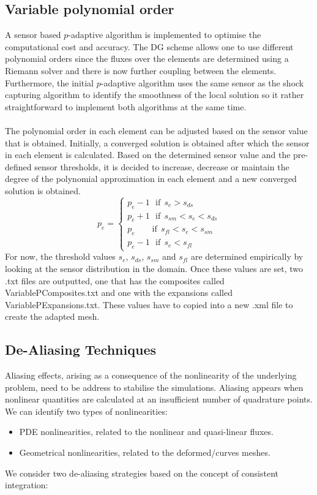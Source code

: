 \subsection{Variable polynomial order}
A sensor based $p$-adaptive algorithm is implemented to optimise the computational cost and accuracy.
The DG scheme allows one to use different polynomial orders since the fluxes over the elements are determined using a Riemann solver and there is now further coupling between the elements. Furthermore, the initial $p$-adaptive algorithm uses the same sensor as the shock capturing algorithm to identify the smoothness of the local solution so it rather straightforward to implement both algorithms at the same time.\\
\\
The polynomial order in each element can be adjusted based on the sensor value that is obtained. Initially, a converged solution is obtained after which the sensor in each element is calculated. Based on the determined sensor value and the pre-defined sensor thresholds, it is decided to increase, decrease or maintain the degree of the polynomial approximation in each element and a new converged solution is obtained.\\
\begin{equation}\label{eq:pswitch}
  p_e =\left \{ \begin{array}{l}
    p_e-1\	\	\ \mbox{if}\		\	 s_e>s_{ds}\\
    p_e+1\	\	\ \mbox{if}\		\	 s_{sm }<s_e<s_{ds}\\
    p_e\	\	\	\	\	\	\	\	\	 \mbox{if}\		\ s_{fl}<s_e<s_{sm}\\
    p_e-1\	\	\ \mbox{if}\		\	 s_e<s_{fl}
    \end{array}
    \right.
\end{equation}
For now, the threshold values $s_e$, $s_{ds}$, $s_{sm}$ and $s_{fl}$ are determined empirically by looking at the sensor distribution in the domain. Once these values are set, two .txt files are outputted, one that has the composites called VariablePComposites.txt and one with the expansions called VariablePExpansions.txt. These values have to copied into a new .xml file to create the adapted mesh.
\subsection{De-Aliasing Techniques}
Aliasing effects, arising as a consequence of the nonlinearity of the
underlying problem, need to be address to stabilise the simulations. Aliasing
appears when nonlinear quantities are calculated at an insufficient number of
quadrature points. We can identify two types of nonlinearities:
\begin{itemize}
\item PDE nonlinearities, related to the nonlinear and quasi-linear fluxes.
\item Geometrical nonlinearities, related to the deformed/curves meshes.
\end{itemize}
We consider two de-aliasing strategies based on the concept of consistent integration:

